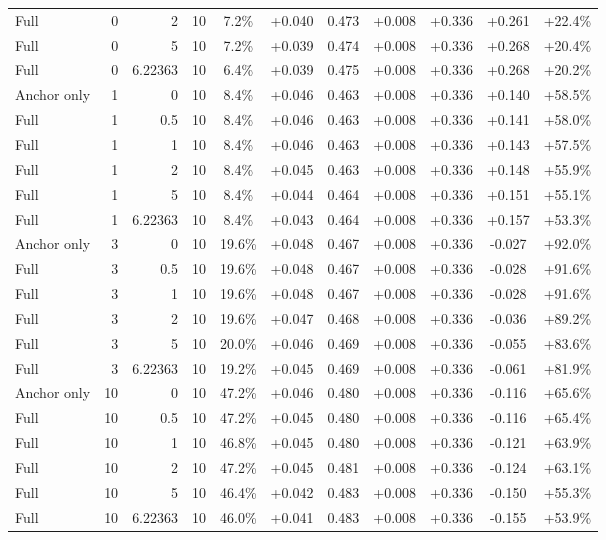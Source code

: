 \begin{table}[htbp]
\begin{tabular}{lrrrccccccc}
Full & 0 & 2 & 10 & 7.2\% & +0.040 & 0.473 & +0.008 & +0.336 & +0.261 & +22.4\% \\
Full & 0 & 5 & 10 & 7.2\% & +0.039 & 0.474 & +0.008 & +0.336 & +0.268 & +20.4\% \\
Full & 0 & 6.22363 & 10 & 6.4\% & +0.039 & 0.475 & +0.008 & +0.336 & +0.268 & +20.2\% \\
Anchor only & 1 & 0 & 10 & 8.4\% & +0.046 & 0.463 & +0.008 & +0.336 & +0.140 & +58.5\% \\
Full & 1 & 0.5 & 10 & 8.4\% & +0.046 & 0.463 & +0.008 & +0.336 & +0.141 & +58.0\% \\
Full & 1 & 1 & 10 & 8.4\% & +0.046 & 0.463 & +0.008 & +0.336 & +0.143 & +57.5\% \\
Full & 1 & 2 & 10 & 8.4\% & +0.045 & 0.463 & +0.008 & +0.336 & +0.148 & +55.9\% \\
Full & 1 & 5 & 10 & 8.4\% & +0.044 & 0.464 & +0.008 & +0.336 & +0.151 & +55.1\% \\
Full & 1 & 6.22363 & 10 & 8.4\% & +0.043 & 0.464 & +0.008 & +0.336 & +0.157 & +53.3\% \\
Anchor only & 3 & 0 & 10 & 19.6\% & +0.048 & 0.467 & +0.008 & +0.336 & -0.027 & +92.0\% \\
Full & 3 & 0.5 & 10 & 19.6\% & +0.048 & 0.467 & +0.008 & +0.336 & -0.028 & +91.6\% \\
Full & 3 & 1 & 10 & 19.6\% & +0.048 & 0.467 & +0.008 & +0.336 & -0.028 & +91.6\% \\
Full & 3 & 2 & 10 & 19.6\% & +0.047 & 0.468 & +0.008 & +0.336 & -0.036 & +89.2\% \\
Full & 3 & 5 & 10 & 20.0\% & +0.046 & 0.469 & +0.008 & +0.336 & -0.055 & +83.6\% \\
Full & 3 & 6.22363 & 10 & 19.2\% & +0.045 & 0.469 & +0.008 & +0.336 & -0.061 & +81.9\% \\
Anchor only & 10 & 0 & 10 & 47.2\% & +0.046 & 0.480 & +0.008 & +0.336 & -0.116 & +65.6\% \\
Full & 10 & 0.5 & 10 & 47.2\% & +0.045 & 0.480 & +0.008 & +0.336 & -0.116 & +65.4\% \\
Full & 10 & 1 & 10 & 46.8\% & +0.045 & 0.480 & +0.008 & +0.336 & -0.121 & +63.9\% \\
Full & 10 & 2 & 10 & 47.2\% & +0.045 & 0.481 & +0.008 & +0.336 & -0.124 & +63.1\% \\
Full & 10 & 5 & 10 & 46.4\% & +0.042 & 0.483 & +0.008 & +0.336 & -0.150 & +55.3\% \\
Full & 10 & 6.22363 & 10 & 46.0\% & +0.041 & 0.483 & +0.008 & +0.336 & -0.155 & +53.9\% \\

\end{tabular}
\end{table}
